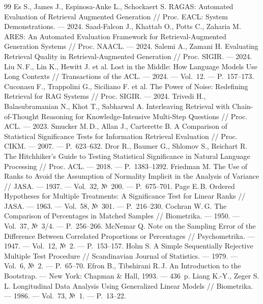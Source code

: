 \begin{thebibliography}{99}
 Es S., James J., Espinosa-Anke L., Schockaert S. RAGAS: Automated Evaluation of Retrieval Augmented Generation // Proc. EACL: System Demonstrations. --- 2024.
 Saad-Falcon J., Khattab O., Potts C., Zaharia M. ARES: An Automated Evaluation Framework for Retrieval-Augmented Generation Systems // Proc. NAACL. --- 2024.
 Salemi A., Zamani H. Evaluating Retrieval Quality in Retrieval-Augmented Generation // Proc. SIGIR. --- 2024.
 Liu N.\,F., Lin K., Hewitt J. et al. Lost in the Middle: How Language Models Use Long Contexts // Transactions of the ACL. --- 2024. --- Vol.~12. --- P.~157--173.
 Cuconasu F., Trappolini G., Siciliano F. et al. The Power of Noise: Redefining Retrieval for RAG Systems // Proc. SIGIR. --- 2024.
 Trivedi H., Balasubramanian N., Khot T., Sabharwal A. Interleaving Retrieval with Chain-of-Thought Reasoning for Knowledge-Intensive Multi-Step Questions // Proc. ACL. --- 2023.
 Smucker M.\,D., Allan J., Carterette B. A Comparison of Statistical Significance Tests for Information Retrieval Evaluation // Proc. CIKM. --- 2007. --- P.~623--632.
 Dror R., Baumer G., Shlomov S., Reichart R. The Hitchhiker's Guide to Testing Statistical Significance in Natural Language Processing // Proc. ACL. --- 2018. --- P.~1383--1392.
 Friedman M. The Use of Ranks to Avoid the Assumption of Normality Implicit in the Analysis of Variance // JASA. --- 1937. --- Vol.~32, №~200. --- P.~675--701.
 Page E.\,B. Ordered Hypotheses for Multiple Treatments: A Significance Test for Linear Ranks // JASA. --- 1963. --- Vol.~58, №~301. --- P.~216--230.
 Cochran W.\,G. The Comparison of Percentages in Matched Samples // Biometrika. --- 1950. --- Vol.~37, №~3/4. --- P.~256--266.
 McNemar Q. Note on the Sampling Error of the Difference Between Correlated Proportions or Percentages // Psychometrika. --- 1947. --- Vol.~12, №~2. --- P.~153--157.
 Holm S. A Simple Sequentially Rejective Multiple Test Procedure // Scandinavian Journal of Statistics. --- 1979. --- Vol.~6, №~2. --- P.~65--70.
 Efron B., Tibshirani R.\,J. An Introduction to the Bootstrap. --- New York: Chapman \& Hall, 1993. --- 436~p.
 Liang K.-Y., Zeger S.\,L. Longitudinal Data Analysis Using Generalized Linear Models // Biometrika. --- 1986. --- Vol.~73, №~1. --- P.~13--22.
\end{thebibliography}
